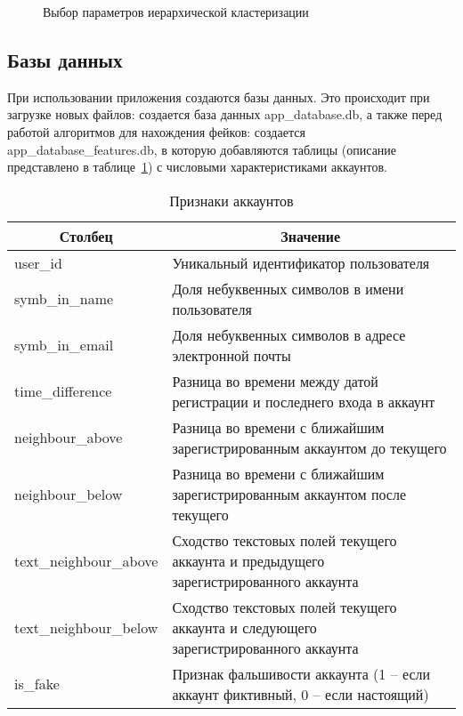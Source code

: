 \begin{figure}[H]
    \caption{Выбор параметров иерархической кластеризации}
    \label{ris:Settings03}
\end{figure}

\subsection{Базы данных}
\label{subsec:Graphic}

При использовании приложения создаются базы данных. Это происходит при загрузке новых файлов: создается база данных app\_database.db, а также перед работой алгоритмов для нахождения фейков: создается app\_database\_features.db, в которую добавляются таблицы (описание представлено в таблице~\ref{tabular:featuresDescription}) с числовыми характеристиками аккаунтов.

\begin{table}[H]
    \caption{Признаки аккаунтов}
    \label{tabular:featuresDescription}
    \vspace{1em}
    \small
    \begin{tabular}{|l|p{11cm}|}
    \hline
    \multicolumn{1}{|c|}{\textbf{Столбец}} & \multicolumn{1}{c|}{\textbf{Значение}}                                          \\ \hline
    user\_id                               & Уникальный идентификатор пользователя                                           \\ \hline
    symb\_in\_name                         & Доля небуквенных символов в имени пользователя                                                     \\ \hline
    symb\_in\_email                         & Доля небуквенных символов в адресе электронной почты                            \\ \hline
    time\_difference                       & Разница во времени между датой регистрации и последнего входа в аккаунт         \\ \hline
    neighbour\_above                       & Разница во времени с ближайшим зарегистрированным аккаунтом до текущего         \\ \hline
    neighbour\_below       & Разница во времени с ближайшим зарегистрированным аккаунтом после текущего            \\ \hline
    text\_neighbour\_above & Сходство текстовых полей текущего аккаунта и предыдущего зарегистрированного аккаунта \\ \hline
    text\_neighbour\_below & Сходство текстовых полей текущего аккаунта и следующего зарегистрированного аккаунта  \\ \hline
    is\_fake                               & Признак фальшивости аккаунта (1 -- если аккаунт фиктивный, 0 -- если настоящий) \\ \hline
    \end{tabular}
\end{table}


